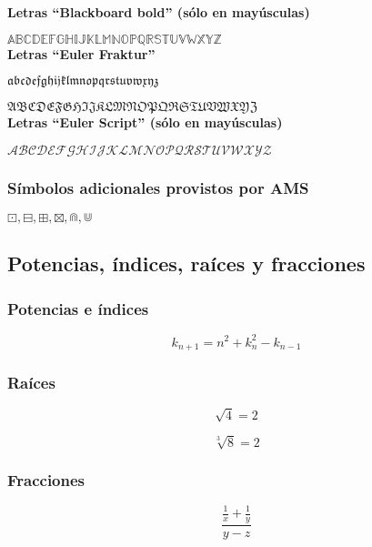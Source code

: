 \documentclass{article}
\begin{document}
\textbf{Letras ``Blackboard bold'' (sólo en mayúsculas)}

$\mathbb{ABCDEFGHIJKLMNOPQRSTUVWXYZ}$ \\

\textbf{Letras ``Euler Fraktur''}

$\mathfrak{abcdefghijklmnopqrstuvwxyz}$

$\mathfrak{ABCDEFGHIJKLMNOPQRSTUVWXYZ}$ \\

\textbf{Letras ``Euler Script'' (sólo en mayúsculas)}

$\mathcal{ABCDEFGHIJKLMNOPQRSTUVWXYZ}$

\subsubsection{Símbolos adicionales provistos por AMS}

$\boxdot, \boxminus, \boxplus, \boxtimes, \Cap, \Cup$

\subsection{Potencias, índices, raíces y fracciones}

\subsubsection{Potencias e índices}

\begin{equation*}
  k_{n+1} = n^2 + k_n^2 - k_{n-1}
\end{equation*}

\subsubsection{Raíces}

\begin{equation*}
  \sqrt{4} = 2
\end{equation*}

\begin{equation*}
  \sqrt[3]{8} = 2
\end{equation*}

\subsubsection{Fracciones}

\begin{equation*}
  \frac{\frac{1}{x}+\frac{1}{y}}{y-z}
\end{equation*}
\end{document}
